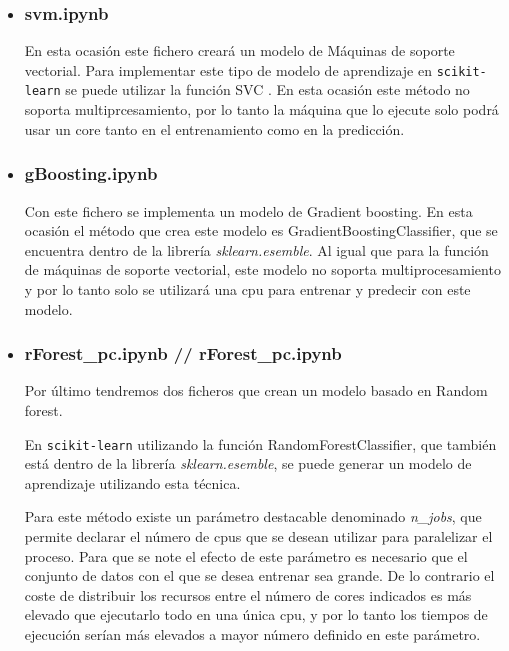 \documentclass[a4paper, 12pt]{book}
\begin{document}
\begin{itemize}
\item \subsubsection{svm.ipynb} 
\label{subsubsub:svm}

En esta ocasión este fichero creará un modelo de Máquinas de soporte vectorial. Para implementar este tipo de modelo de aprendizaje en \texttt{scikit-learn} se puede utilizar la función SVC \cite{SVMDocumentation}. En esta ocasión este método no soporta multiprcesamiento, por lo tanto la máquina que lo ejecute solo podrá usar un core tanto en el entrenamiento como en la predicción. 

\item \subsubsection{gBoosting.ipynb} 
\label{subsubsub:gBoosting}

Con este fichero se implementa un modelo de Gradient boosting. En esta ocasión el método que crea este modelo es GradientBoostingClassifier\cite{GradientTreeBDoc}, que se encuentra dentro de la librería \textit{sklearn.esemble}. Al igual que para la función de máquinas de soporte vectorial, este modelo no soporta multiprocesamiento y por lo tanto solo se utilizará una cpu para entrenar y predecir con este modelo. 
\item \subsubsection{rForest\_pc.ipynb // rForest\_pc.ipynb} 
\label{subsubsub:rForest}

Por último tendremos dos ficheros que crean un modelo basado en Random forest.

En \texttt{scikit-learn} utilizando la función RandomForestClassifier\cite{RandomForestDoc}, que también está dentro de la librería \textit{sklearn.esemble}, se puede generar un modelo de aprendizaje utilizando esta técnica.

Para este método existe un parámetro destacable denominado \textit{n\_jobs}, que permite declarar el número de cpus que se desean utilizar para paralelizar el proceso. Para que se note el efecto de este parámetro es necesario que el conjunto de datos con el que se desea entrenar sea grande. De lo contrario el coste de distribuir los recursos entre el número de cores indicados es más elevado que ejecutarlo todo en una única cpu, y por lo tanto los tiempos de ejecución serían más elevados a mayor número definido en este parámetro.


\end{itemize}
\end{document}
